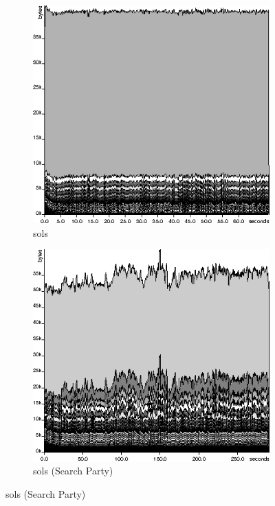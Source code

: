 \begin{figure}[t]
  \begin{subfigure}{0.4\textwidth}
    \includegraphics[width=\textwidth]{space/sols-orig}
    \caption{sols}
    \label{fig:examples-space:sols-orig}
  \end{subfigure}
  \begin{subfigure}{0.4\textwidth}
    \includegraphics[width=\textwidth]{space/sols-sp}
    \caption{sols (Search Party)}
    \label{fig:examples-space:sols-sp}
  \end{subfigure}


\end{figure}
